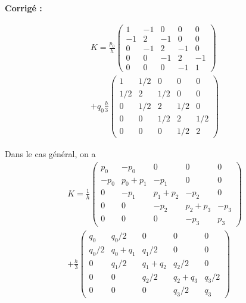 \documentclass[a4paper,12pt]{article}
\newif\ifcorriges
\newenvironment{solution}
  {
    \ifcorriges
      \begin{framed}
      \par\noindent\textbf{Corrigé :} 
  }
  {
      \end{framed}
    \fi
  }
\begin{document}
\begin{enumerate}
\begin{solution}
\begin{enumerate}
                \begin{multline*}
                K = \frac{p_0}{h}
                \begin{pmatrix}
                    1 & -1 & 0 & 0 & 0\\
                    -1 & 2 & -1 & 0 & 0\\
                    0 & -1 & 2 & -1 & 0\\
                    0 & 0 & -1 & 2 & -1\\
                    0 & 0 & 0 & -1 & 1
                \end{pmatrix} \\ 
                + q_0 \frac{h}{3}
                \begin{pmatrix}
                    1 & 1/2 & 0 & 0 & 0\\
                    1/2 & 2 & 1/2 & 0 & 0\\
                    0 & 1/2 & 2  & 1/2 & 0\\
                    0 & 0 & 1/2 & 2 & 1/2\\
                    0 & 0 & 0 & 1/2 & 2
                \end{pmatrix}
                \end{multline*}

                Dans le cas général, on a 
                \begin{multline*}
                K = \frac{1}{h}
                \begin{pmatrix}
                    p_0 & -p_0 & 0 & 0 & 0\\
                    -p_0 & p_0+p_1 & -p_1 & 0 & 0\\
                    0 & -p_1 & p_1+p_2 & -p_2 & 0\\
                    0 & 0 & -p_2 & p_2+p_3 & -p_3\\
                    0 & 0 & 0 & -p_3 & p_3
                \end{pmatrix}\\
                + \frac{h}{3}
                \begin{pmatrix}
                    q_0 & q_0/2 & 0 & 0 & 0\\
                    q_0/2 & q_0+q_1 & q_1/2 & 0 & 0\\
                    0 & q_1/2 & q_1+q_2 & q_2/2 & 0\\
                    0 & 0 & q_2/2 & q_2+q_3 & q_3/2\\
                    0 & 0 & 0 & q_3/2 & q_3
                \end{pmatrix}
                \end{multline*}


\end{enumerate}
\end{solution}
\end{enumerate}
\end{document}
